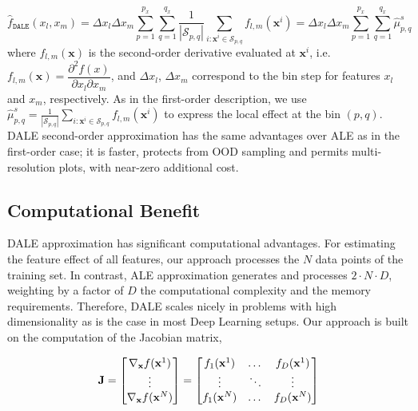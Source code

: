 \documentclass[wcp]{jmlr}
\newcommand{\dale}{\hat{f}_{\mathtt{DALE}}}
\newcommand{\xb}{\mathbf{x}} \newcommand{\R}{\mathbb{R}}
\begin{document}
\begin{equation} \dale(x_l, x_m) = \Delta x_l \Delta x_m \sum_{p=1}^{p_x} \sum_{q=1}^{q_x} \frac{1}{|\mathcal{S}_{p,q}|} \sum_{i:\xb^i \in \mathcal{S}_{p,q}}f_{l,m}(\xb^i) = \Delta x_l \Delta x_m \sum_{p=1}^{p_x} \sum_{q=1}^{q_x} \hat{\mu}_{p,q}^s
  \label{eq:DALE-2}
\end{equation}
%
where \( f_{l,m}(\xb) \) is the second-order derivative evaluated at \(\xb^i\), i.e.  \( f_{l,m}(\xb) = \dfrac{\partial^2f(x)}{\partial x_l \partial x_m} \), and \(\Delta x_l\), \(\Delta x_m\) correspond to the bin step for features \(x_l\) and \(x_m\), respectively. As in the first-order description, we use \( \hat{\mu}_{p,q}^s = \frac{1}{|\mathcal{S}_{p,q}|} \sum_{i:\xb^i \in \mathcal{S}_{p,q}}f_{l,m}(\xb^i)\) to express the local effect at the bin \( (p, q) \). DALE second-order approximation has the same advantages over ALE as in the first-order case; it is faster, protects from OOD sampling and permits multi-resolution plots, with near-zero additional cost.

\subsection{Computational Benefit}
\label{sec:4-2-computational}

DALE approximation has significant computational advantages. For estimating the feature effect of all features, our approach processes the \(N\) data points of the training set. In contrast, ALE approximation generates and processes \(2 \cdot N \cdot D\), weighting by a factor of \(D\) the computational complexity and the memory requirements. Therefore, DALE scales nicely in problems with high dimensionality as is the case in most Deep Learning setups. Our approach is built on the computation of the Jacobian matrix,

\begin{equation} \Jac =
  \begin{bmatrix} \nabla_{\xb}f(\xb^1) \\ \vdots \\ \nabla_{\xb}f(\xb^N)
  \end{bmatrix} =
  \begin{bmatrix} f_1(\xb^1) & \dots & f_D(\xb^1)\\ \vdots & \ddots & \vdots \\ f_1(\xb^N) & \dots & f_D(\xb^N)
  \end{bmatrix}
\label{eq:jacobian}
\end{equation}
\end{document}
